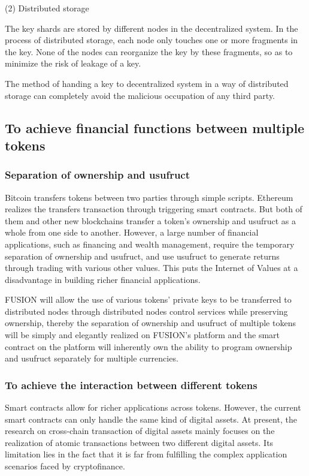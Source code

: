 \documentclass[a4paper,12pt]{article}
\begin{document}
(2) Distributed storage

The key shards are stored by different nodes in the decentralized system. In the process of distributed storage, each node only touches one or more fragments in the key. None of the nodes can reorganize the key by these fragments, so as to minimize the risk of leakage of a key.

The method of handing a key to decentralized system in a way of distributed storage can completely avoid the malicious occupation of any third party.

\subsection{To achieve financial functions between multiple tokens}

\subsubsection {Separation of ownership and usufruct}

Bitcoin transfers tokens between two parties through simple scripts. Ethereum realizes the transfers transaction through triggering smart contracts. But both of them and other new blockchains transfer a token’s ownership and usufruct as a whole from one side to another. However, a large number of financial applications, such as financing and wealth management, require the temporary separation of ownership and usufruct, and use usufruct to generate returns through trading with various other values. This puts the Internet of Values at a disadvantage in building richer financial applications. 

FUSION will allow the use of various tokens’ private keys to be transferred to distributed nodes through distributed nodes control services while preserving ownership, thereby the separation of ownership and usufruct of multiple tokens will be simply and elegantly realized on FUSION’s platform and the smart contract on the platform will inherently own the ability to program ownership and usufruct separately for multiple currencies. 

\subsubsection{To achieve the interaction between different tokens}

Smart contracts allow for richer applications across tokens. However, the current smart contracts can only handle the same kind of digital assets. At present, the research on cross-chain transaction of digital assets mainly focuses on the realization of atomic transactions between two different digital assets. Its limitation lies in the fact that it is far from fulfilling the complex application scenarios faced by cryptofinance.
\end{document}
